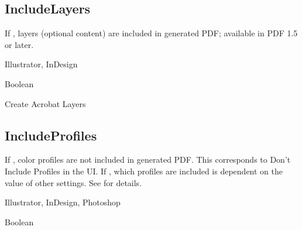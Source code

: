 \documentclass[letterpaper,12pt,english,openany,oneside]{sphinxmanual}
\begin{document}
\subsection{IncludeLayers}
\label{\detokenize{PDF_Create_NewNamespaces:includelayers}}
If  , layers (optional content) are included in generated PDF; available in PDF 1.5 or later.

\label{\detokenize{PDF_Create_NewNamespaces:supported-by-15}}

Illustrator, InDesign

\label{\detokenize{PDF_Create_NewNamespaces:type-15}}

Boolean

\label{\detokenize{PDF_Create_NewNamespaces:ui-name-15}}

Create Acrobat Layers

\label{\detokenize{PDF_Create_NewNamespaces:default-value-14}}

\begin{sphinxVerbatim}[commandchars=\\\{\}]
\end{sphinxVerbatim}




\subsection{IncludeProfiles}
\label{\detokenize{PDF_Create_NewNamespaces:includeprofiles}}
If  , color profiles are not included in generated PDF. This corresponds to Don’t Include Profiles in the UI. If  , which profiles are included is dependent on the value of other settings. See  for details.

\label{\detokenize{PDF_Create_NewNamespaces:supported-by-16}}

Illustrator, InDesign, Photoshop

\label{\detokenize{PDF_Create_NewNamespaces:type-16}}

Boolean

\label{\detokenize{PDF_Create_NewNamespaces:ui-name-16}}
\end{document}
